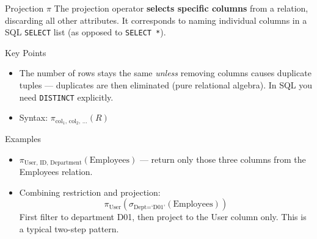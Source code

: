 \begin{frame}{Projection $\pi$}
  The projection operator \textbf{selects specific columns} from a
  relation, discarding all other attributes.  It corresponds to naming
  individual columns in a SQL \texttt{SELECT} list (as opposed to
  \texttt{SELECT *}).

  \begin{block}{Key Points}
    \begin{itemize}
      \item The number of rows stays the same \emph{unless} removing
            columns causes duplicate tuples — duplicates are then
            eliminated (pure relational algebra).  In SQL you need
            \texttt{DISTINCT} explicitly.
      \item Syntax: $\pi_{\text{col}_1,\,\text{col}_2,\,\ldots}(R)$
    \end{itemize}
  \end{block}

  \begin{examples}{Examples}
    \begin{itemize}
      \item $\pi_{\text{User, ID, Department}}(\text{Employees})$ —
            return only those three columns from the Employees relation.
      \item Combining restriction and projection:
            \[
              \pi_{\text{User}}\!\left(\sigma_{\text{Dept}=\text{`D01'}}(\text{Employees})\right)
            \]
            First filter to department D01, then project to the User
            column only.  This is a typical two-step pattern.
    \end{itemize}
  \end{examples}
\end{frame}

